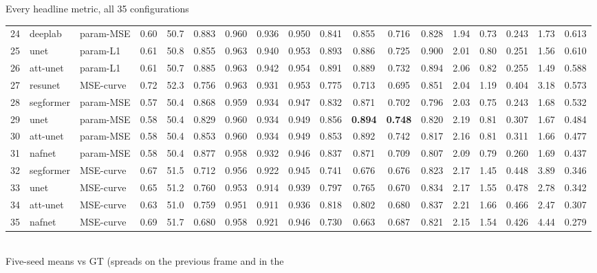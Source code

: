 \begin{frame}{Every headline metric, all 35 configurations}
\begin{tabular}{@{}r l l c c c c c c c c c c c c c c c@{}}
    \rowcolor{soft!18} 24 & deeplab & param-MSE & 0.60 & 50.7 & 0.883 & 0.960 & 0.936 & 0.950 & 0.841 & 0.855 & 0.716 & 0.828 & 1.94 & 0.73 & 0.243 & 1.73 & 0.613 \\
    25 & unet & param-L1 & 0.61 & 50.8 & 0.855 & 0.963 & 0.940 & 0.953 & 0.893 & 0.886 & 0.725 & 0.900 & 2.01 & 0.80 & 0.251 & 1.56 & 0.610 \\
    26 & att-unet & param-L1 & 0.61 & 50.7 & 0.885 & 0.963 & 0.942 & 0.954 & 0.891 & 0.889 & 0.732 & 0.894 & 2.06 & 0.82 & 0.255 & 1.49 & 0.588 \\
    \rowcolor{soft!18} 27 & resunet & MSE-curve & 0.72 & 52.3 & 0.756 & 0.963 & 0.931 & 0.953 & 0.775 & 0.713 & 0.695 & 0.851 & 2.04 & 1.19 & 0.404 & 3.18 & 0.573 \\
    \rowcolor{soft!18} 28 & segformer & param-MSE & 0.57 & 50.4 & 0.868 & 0.959 & 0.934 & 0.947 & 0.832 & 0.871 & 0.702 & 0.796 & 2.03 & 0.75 & 0.243 & 1.68 & 0.532 \\
    \rowcolor{soft!18} 29 & unet & param-MSE & 0.58 & 50.4 & 0.829 & 0.960 & 0.934 & 0.949 & 0.856 & \textbf{0.894} & \textbf{0.748} & 0.820 & 2.19 & 0.81 & 0.307 & 1.67 & 0.484 \\
    \rowcolor{soft!18} 30 & att-unet & param-MSE & 0.58 & 50.4 & 0.853 & 0.960 & 0.934 & 0.949 & 0.853 & 0.892 & 0.742 & 0.817 & 2.16 & 0.81 & 0.311 & 1.66 & 0.477 \\
    \rowcolor{soft!18} 31 & nafnet & param-MSE & 0.58 & 50.4 & 0.877 & 0.958 & 0.932 & 0.946 & 0.837 & 0.871 & 0.709 & 0.807 & 2.09 & 0.79 & 0.260 & 1.69 & 0.437 \\
    \rowcolor{soft!18} 32 & segformer & MSE-curve & 0.67 & 51.5 & 0.712 & 0.956 & 0.922 & 0.945 & 0.741 & 0.676 & 0.676 & 0.823 & 2.17 & 1.45 & 0.448 & 3.89 & 0.346 \\
    \rowcolor{soft!18} 33 & unet & MSE-curve & 0.65 & 51.2 & 0.760 & 0.953 & 0.914 & 0.939 & 0.797 & 0.765 & 0.670 & 0.834 & 2.17 & 1.55 & 0.478 & 2.78 & 0.342 \\
    \rowcolor{soft!18} 34 & att-unet & MSE-curve & 0.63 & 51.0 & 0.759 & 0.951 & 0.911 & 0.936 & 0.818 & 0.802 & 0.680 & 0.837 & 2.21 & 1.66 & 0.466 & 2.47 & 0.307 \\
    \rowcolor{soft!18} 35 & nafnet & MSE-curve & 0.69 & 51.7 & 0.680 & 0.958 & 0.921 & 0.946 & 0.730 & 0.663 & 0.687 & 0.821 & 2.15 & 1.54 & 0.426 & 4.44 & 0.279 \\
    \bottomrule
  \end{tabular}
  \\[0pt]
  {\tiny\color{soft} Five-seed means vs GT (spreads on the previous frame and in the
}
\end{frame}
